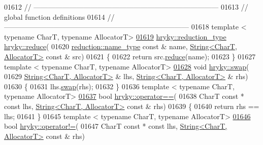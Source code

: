 \begin{DoxyCode}
01612 \textcolor{comment}{//
      ------------------------------------------------------------------------------}
01613 \textcolor{comment}{// global function definitions}
01614 \textcolor{comment}{//
      ------------------------------------------------------------------------------}
01618 \textcolor{comment}{}\textcolor{keyword}{template} < \textcolor{keyword}{typename} CharT, \textcolor{keyword}{typename} AllocatorT>
\hypertarget{string_8h_source_l01619}{}\hyperlink{namespacehryky_a152066a60658e596644dd53e09195097}{01619} \hyperlink{classhryky_1_1_intrusive_ptr}{hryky::reduction_type} \hyperlink{namespacehryky_af41cb3af6766761da0ff21b84527a52c}{hryky::reduce}(
01620     \hyperlink{classhryky_1_1reduction_1_1_string}{reduction::name_type} \textcolor{keyword}{const} & name, \hyperlink{classhryky_1_1_string}{String<CharT, AllocatorT>} \textcolor{keyword}{const} & src)
01621 \{
01622     \textcolor{keywordflow}{return} src.\hyperlink{classhryky_1_1_string_a03adae56f3604b70e4cf17c8473c667a}{reduce}(name);
01623 \}
01627 \textcolor{keyword}{template} < \textcolor{keyword}{typename} CharT, \textcolor{keyword}{typename} AllocatorT>
\hypertarget{string_8h_source_l01628}{}\hyperlink{namespacehryky_a600e415922f06a6098359a86c0055eea}{01628} \textcolor{keywordtype}{void} \hyperlink{namespacehryky_a4282146df5ea2b68cb667896a2205909}{hryky::swap}(
01629     \hyperlink{classhryky_1_1_string}{String<CharT, AllocatorT>} & lhs, \hyperlink{classhryky_1_1_string}{String<CharT, AllocatorT>} & rhs)
01630 \{
01631     lhs.\hyperlink{classhryky_1_1_string_a5ff47f11c86f2cf71e7e2d1427c1474b}{swap}(rhs);
01632 \}
01636 \textcolor{keyword}{template} < \textcolor{keyword}{typename} CharT, \textcolor{keyword}{typename} AllocatorT>
\hypertarget{string_8h_source_l01637}{}\hyperlink{namespacehryky_a96bfe0df0a09db56e7253330de4f2243}{01637} \textcolor{keywordtype}{bool} \hyperlink{namespacehryky_a96bfe0df0a09db56e7253330de4f2243}{hryky::operator==}(
01638     CharT \textcolor{keyword}{const} * \textcolor{keyword}{const} lhs, \hyperlink{classhryky_1_1_string}{String<CharT, AllocatorT>} \textcolor{keyword}{const} & rhs)
01639 \{
01640     \textcolor{keywordflow}{return} rhs == lhs;
01641 \}
01645 \textcolor{keyword}{template} < \textcolor{keyword}{typename} CharT, \textcolor{keyword}{typename} AllocatorT>
\hypertarget{string_8h_source_l01646}{}\hyperlink{namespacehryky_af83d27d9a54004f5981499e910bb7cb8}{01646} \textcolor{keywordtype}{bool} \hyperlink{namespacehryky_af83d27d9a54004f5981499e910bb7cb8}{hryky::operator!=}(
01647     CharT \textcolor{keyword}{const} * \textcolor{keyword}{const} lhs, \hyperlink{classhryky_1_1_string}{String<CharT, AllocatorT>} \textcolor{keyword}{const} & rhs)

\end{DoxyCode}
